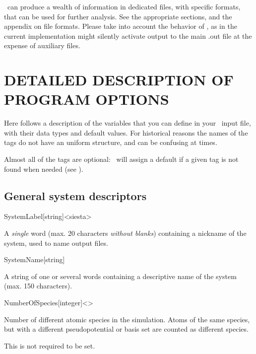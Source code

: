 \siesta\ can produce a wealth of information in dedicated files,
with specific formats, that can be used for further analysis. See the
appropriate sections, and the appendix on file formats.
Please take into account the behavior of
, as in the current implementation might silently
activate output to the main .out file at the expense of auxiliary
files.


\section{DETAILED DESCRIPTION OF PROGRAM OPTIONS}


Here follows a description of the variables that you can define in
your \siesta\ input file, with their data types and default
values. For historical reasons the names of the tags do not have an
uniform structure, and can be confusing at times.

Almost all of the tags are optional: \siesta\ will assign a
default if a given tag is not found when needed (see ).


\subsection{General system descriptors}

\begin{fdfentry}{SystemLabel}[string]<siesta>
  
  A \emph{single} word (max. 20 characters \emph{without blanks})
  containing a nickname of the system, used to name output files.

\end{fdfentry}


\begin{fdfentry}{SystemName}[string]

  A string of one or several words containing a descriptive name of
  the system (max. 150 characters).
  
\end{fdfentry}


\begin{fdfentry}{NumberOfSpecies}[integer]<>

  Number of different atomic species in the simulation.  Atoms of the
  same species, but with a different pseudopotential or basis set are
  counted as different species.

  \note This is not required to be set.
  
\end{fdfentry}

